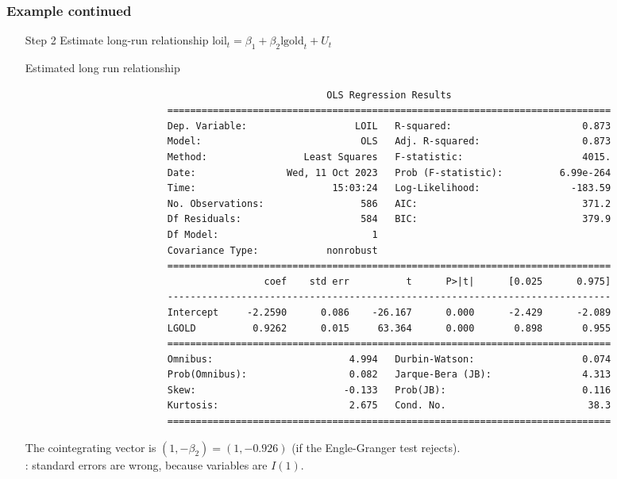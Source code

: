 \begin{frame}[fragile]\frametitle{Example continued}
\begin{itemize}
\item[Step 2] Estimate long-run relationship
$\textrm{loil}_t = \beta_1+\beta_2\textrm{lgold}_t+U_t$
\begin{block}{Estimated long run relationship}
\tiny
\begin{verbatim}
                                                     OLS Regression Results
                         ==============================================================================
                         Dep. Variable:                   LOIL   R-squared:                       0.873
                         Model:                            OLS   Adj. R-squared:                  0.873
                         Method:                 Least Squares   F-statistic:                     4015.
                         Date:                Wed, 11 Oct 2023   Prob (F-statistic):          6.99e-264
                         Time:                        15:03:24   Log-Likelihood:                -183.59
                         No. Observations:                 586   AIC:                             371.2
                         Df Residuals:                     584   BIC:                             379.9
                         Df Model:                           1
                         Covariance Type:            nonrobust
                         ==============================================================================
                                          coef    std err          t      P>|t|      [0.025      0.975]
                         ------------------------------------------------------------------------------
                         Intercept     -2.2590      0.086    -26.167      0.000      -2.429      -2.089
                         LGOLD          0.9262      0.015     63.364      0.000       0.898       0.955
                         ==============================================================================
                         Omnibus:                        4.994   Durbin-Watson:                   0.074
                         Prob(Omnibus):                  0.082   Jarque-Bera (JB):                4.313
                         Skew:                          -0.133   Prob(JB):                        0.116
                         Kurtosis:                       2.675   Cond. No.                         38.3
                         ==============================================================================
\end{verbatim}
\end{block}
The cointegrating vector is $(1, -\beta_2) = (1, -0.926)$ (if the Engle-Granger test rejects). \\
: standard errors are wrong, because variables are $I(1)$.
\end{itemize}
\end{frame}
